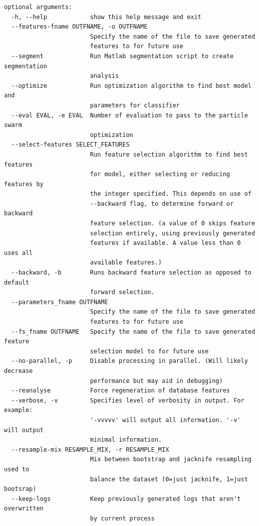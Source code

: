 \documentclass[titlepage, 12pt]{scrartcl} \usepackage{enumitem}
\begin{document}
\begin{lstlisting}[numbers=none]
optional arguments:
  -h, --help            show this help message and exit
  --features-fname OUTFNAME, -o OUTFNAME
                        Specify the name of the file to save generated
                        features to for future use
  --segment             Run Matlab segmentation script to create segmentation
                        analysis
  --optimize            Run optimization algorithm to find best model and
                        parameters for classifier
  --eval EVAL, -e EVAL  Number of evaluation to pass to the particle swarm
                        optimization
  --select-features SELECT_FEATURES
                        Run feature selection algorithm to find best features
                        for model, either selecting or reducing features by
                        the integer specified. This depends on use of
                        --backward flag, to determine forward or backward
                        feature selection. (a value of 0 skips feature
                        selection entirely, using previously generated
                        features if available. A value less than 0 uses all
                        available features.)
  --backward, -b        Runs backward feature selection as opposed to default
                        forward selection.
  --parameters_fname OUTFNAME
                        Specify the name of the file to save generated
                        features to for future use
  --fs_fname OUTFNAME   Specify the name of the file to save generated feature
                        selection model to for future use
  --no-parallel, -p     Disable processing in parallel. (Will likely decrease
                        performance but may aid in debugging)
  --reanalyse           Force regeneration of database features
  --verbose, -v         Specifies level of verbosity in output. For example:
                        '-vvvvv' will output all information. '-v' will output
                        minimal information.
  --resample-mix RESAMPLE_MIX, -r RESAMPLE_MIX
                        Mix between bootstrap and jacknife resampling used to
                        balance the dataset (0=just jacknife, 1=just bootsrap)
  --keep-logs           Keep previously generated logs that aren't overwritten
                        by current process
\end{lstlisting}
\doublespacing
\pagebreak{}
\printbibliography{}
\end{document}
